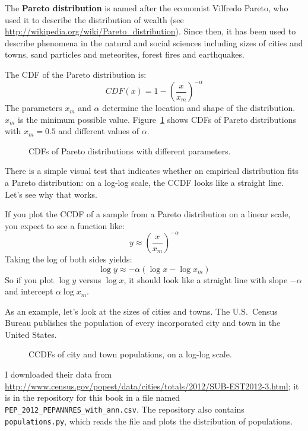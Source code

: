 The {\bf Pareto distribution} is named after the economist Vilfredo Pareto,
who used it to describe the distribution of wealth (see
\url{http://wikipedia.org/wiki/Pareto_distribution}).  Since then, it
has been used to describe phenomena in the natural and social sciences
including sizes of cities and towns, sand particles and meteorites,
forest fires and earthquakes.  

The CDF of the Pareto distribution is:
%
\[ CDF(x) = 1 - \left( \frac{x}{x_m} \right) ^{-\alpha} \]
%
The parameters $x_{m}$ and $\alpha$ determine the location and shape
of the distribution. $x_{m}$ is the minimum possible value.
Figure~\ref{analytic_pareto_cdf} shows CDFs of Pareto
distributions with $x_{m} = 0.5$ and different values
of $\alpha$.

\begin{figure}
\caption{CDFs of Pareto distributions with different parameters.}
\label{analytic_pareto_cdf}
\end{figure}

There is a simple visual test that indicates whether an empirical
distribution fits a Pareto distribution: on a log-log scale, the CCDF
looks like a straight line.  Let's see why that works.

If you plot the CCDF of a sample from a Pareto distribution on a
linear scale, you expect to see a function like:
%
\[ y \approx \left( \frac{x}{x_m} \right) ^{-\alpha} \]
%
Taking the log of both sides yields:
%
\[ \log y \approx -\alpha (\log x - \log x_{m})\]
%
So if you plot $\log y$ versus $\log x$, it should look like a straight
line with slope $-\alpha$ and intercept
$\alpha \log x_{m}$.

As an example, let's look at the sizes of cities and towns.
The U.S.~Census Bureau publishes the
population of every incorporated city and town in the United States.
 
  

\begin{figure}
\caption{CCDFs of city and town populations, on a log-log scale.}
\label{populations_pareto}
\end{figure}

I downloaded their data from
\url{http://www.census.gov/popest/data/cities/totals/2012/SUB-EST2012-3.html};
it is in the repository for this book in a file named
\verb"PEP_2012_PEPANNRES_with_ann.csv".  The repository also
contains {\tt populations.py}, which reads the file and plots
the distribution of populations.

